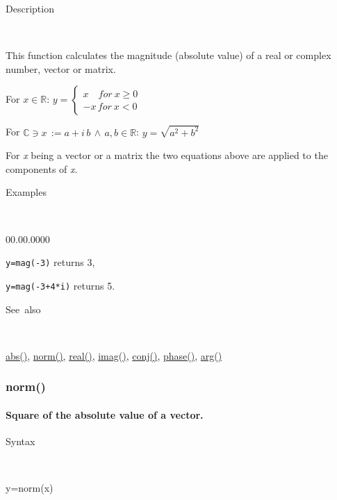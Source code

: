 \begin{description}
\item [Description]~
\end{description}
This function calculates the magnitude (absolute value) of a real
or complex number, vector or matrix.

\medskip{}
For $x\in\mathbb{R}$: $y=\left\{ \begin{array}{l}
x\quad for\: x\geq0\\
-x\, for\: x<0\end{array}\right.$
\medskip{}

For $\mathbb{\mathbb{C}}\ni x\,:=a+i\, b\,\wedge\, a,b\in\mathbb{R}$:
$y=\sqrt{a^{2}+b^{2}}$
\medskip{}

For \textit{x} being a vector or a matrix the two equations above
are applied to the components of \textit{x}.

\begin{description}
\item [Examples]~
\end{description}
\begin{lyxlist}{00.00.0000}
\item [\texttt{y=mag(-3)}]returns 3,
\item [\texttt{y=mag(-3+4{*}i)}]returns 5.
\end{lyxlist}
\begin{description}
\item [See~also]~
\end{description}
\textcolor{blue}{\hyperlink{abs}{abs()}}, \textcolor{blue}{\hyperlink{norm}{norm()}},
\textcolor{blue}{\hyperlink{real}{real()}}, \textcolor{blue}{\hyperlink{imag}{imag()}},
\textcolor{blue}{\hyperlink{conj}{conj()}}, \textcolor{blue}{\hyperlink{phase}{phase()}},
\textcolor{blue}{\hyperlink{arg}{arg()}}


\newpage
\subsubsection*{\hypertarget{norm}{}{\Large norm()}}


\paragraph{\label{par:norm}Square of the absolute value of a vector.}

\begin{description}
\item [Syntax]~
\end{description}
y=norm(x)

